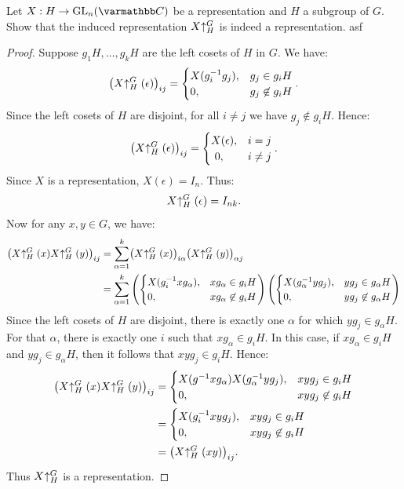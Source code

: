 \begin{exercise}
	
\end{exercise}

\begin{exercise}
	Let $X:H \rightarrow \GL_n(\bfC)$ be a representation and $H$ a subgroup of $G$. Show that the induced representation $X\hspace{-2.5pt}\uparrow_H^G$ is indeed a representation. asf
\end{exercise}
	\begin{proof}
		Suppose $g_1H,\ldots ,g_kH$ are the left cosets of $H$ in $G$. We have:
		\[
			\bigl( X \hspace{-2.5pt}\uparrow_H^G (\epsilon) \bigr)_{ij} =
			\begin{cases}
				X(g_i^{-1}g_j), & g_j \in g_iH \\
				0, & g_j \not\in g_iH
			\end{cases}.
		\] 
		Since the left cosets of $H$ are disjoint, for all $i \neq j$ we have $g_j \not\in g_iH$. Hence:
		\[
			\bigl( X \hspace{-2.5pt}\uparrow_H^G (\epsilon) \bigr)_{ij} =
			\begin{cases}
				X(\epsilon), & i = j \\\
				0, & i \neq j
			\end{cases}.
		\]
		Since $X$ is a representation, $X(\epsilon) = I_n$. Thus:
		\[
			X\hspace{-2.5pt}\uparrow_H^G(\epsilon) = I_{nk}.
		\] 
		Now for any $x,y \in G$, we have:
		\begin{align*}
			\bigl( X\hspace{-2.5pt}\uparrow_H^G(x) X\hspace{-2.5pt}\uparrow_H^G(y) \bigr)_{ij}
			&= \sum_{\alpha = 1}^{k} \bigl( X\hspace{-2.5pt}\uparrow_H^G(x) \bigr)_{i\alpha} \bigl( X\hspace{-2.5pt}\uparrow_H^G(y) \bigr)_{\alpha j} \\
			&= \sum_{\alpha = 1}^{k} \left(\begin{cases}X(g_i^{-1}xg_\alpha), &xg_\alpha \in g_iH \\ 0, & xg_\alpha \not\in g_iH \end{cases} \right) \left( \begin{cases} X(g_\alpha^{-1}yg_j), &y g_j \in g_\alpha H \\ 0, & yg_j \not\in g_\alpha H \end{cases} \right) 
		\end{align*}
		Since the left cosets of $H$ are disjoint, there is exactly one $\alpha$ for which $yg_j \in g_\alpha H$. For that $\alpha$, there is exactly one $i$ such that $xg_\alpha \in g_i H$. In this case, if $x g_\alpha \in g_i H$ and $y g_j \in g_\alpha H$, then it follows that $xy g_j \in g_i H$. Hence:
		\begin{align*}
			\bigl( X\hspace{-2.5pt}\uparrow_H^G(x) X\hspace{-2.5pt}\uparrow_H^G(y) \bigr)_{ij}
			&=  
			\begin{cases} 
				X(g^{-1}x g_\alpha) X(g_\alpha ^{-1}y  g_j), & xy g_j \in g_i H \\
				0, & xy g_j \not\in g_i H
			\end{cases}\\
			&=
			\begin{cases}
				X(g_i^{-1}xyg_j), &xyg_j \in g_i H \\
				0, & xyg_j \not\in g_i H
			\end{cases}\\
			&= \bigl( X\hspace{-2.5pt}\uparrow_H^G(xy) \bigr)_{ij}.
		\end{align*}
		Thus $X\hspace{-2.5pt}\uparrow_H^G$ is a representation.
	\end{proof}


